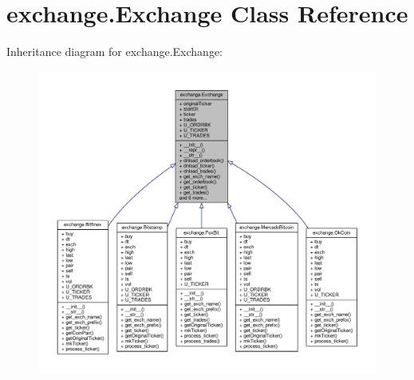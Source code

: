 \hypertarget{classexchange_1_1_exchange}{}\section{exchange.\+Exchange Class Reference}
\label{classexchange_1_1_exchange}


Inheritance diagram for exchange.\+Exchange\+:
\nopagebreak
\begin{figure}[H]
\begin{center}
\leavevmode
\includegraphics[width=350pt]{classexchange_1_1_exchange__inherit__graph}
\end{center}
\end{figure}


